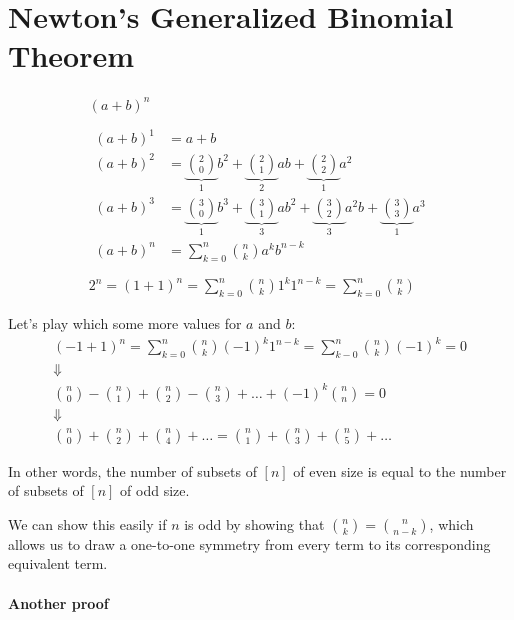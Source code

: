 \documentclass[00_complete]{subfiles}
\begin{document}
\section{Newton's Generalized Binomial Theorem}

$$
\begin{gathered}
(a+b)^n \\ \\
\begin{aligned}
    (a+b)^1 &= a+b \\
    (a+b)^2 &= \underbrace{\binom{2}{0}}_{1}b^2+ \underbrace{\binom{2}{1}}_{2}ab + \underbrace{\binom{2}{2}}_{1}a^2 \\
    (a+b)^3 &= \underbrace{\binom{3}{0}}_{1}b^3+ \underbrace{\binom{3}{1}}_{3}ab^2 + \underbrace{\binom{3}{2}}_{3}a^2b + \underbrace{\binom{3}{3}}_{1}a^3 \\
    (a+b)^n &= \sum_{k=0}^n \binom{n}{k} a^{k}b^{n-k}
\end{aligned} \\ \\
2^n = (1+1)^n= \sum_{k=0}^n \binom{n}{k}1^k1^{n-k} = \sum_{k=0}^{n} \binom{n}{k}
\end{gathered}
$$

Let's play which some more values for $a$ and $b$:
$$
\begin{gathered}
    (-1+1)^n=\sum_{k=0}^{n} \binom{n}{k}(-1)^k1^{n-k} =
    \sum_{k-0}^{n}\binom{n}{k}(-1)^k = 0 \\
    \Downarrow \\
    \binom{n}{0} - \binom{n}{1} + \binom{n}{2} - \binom{n}{3} + \dots +
    (-1)^k\binom{n}{n}=0 \\
    \Downarrow \\
    \binom{n}{0} + \binom{n}{2} + \binom{n}{4} + \dots = \binom{n}{1} + \binom{n}{3} +
    \binom{n}{5} + \dots
\end{gathered}
$$

\begin{conclusion}
In other words, the number of subsets of $[n]$ of even size is equal to the
number of subsets of $[n]$ of odd size.

We can show this easily if $n$ is odd by showing that $\binom{n}{k} = \binom{n}{n-k}$, which
allows us to draw a one-to-one symmetry from every term to its corresponding
equivalent term.
\end{conclusion}

\paragraph{Another proof}
\end{document}

